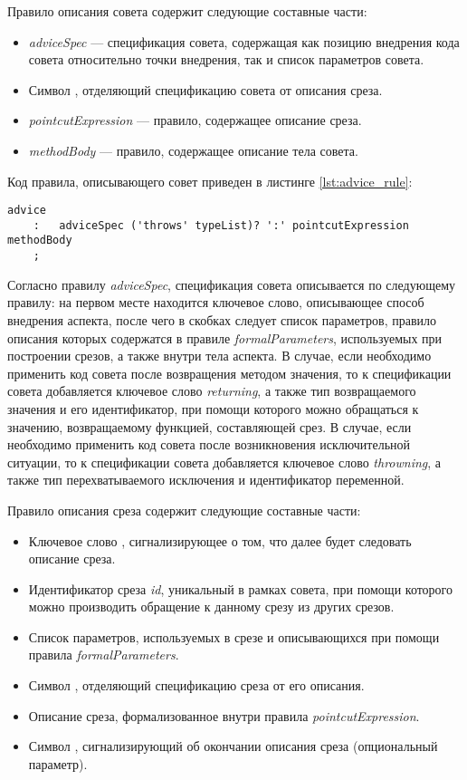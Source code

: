 Правило описания совета содержит следующие составные части:
\begin{itemize}
	\item \textit{adviceSpec} --- спецификация совета, содержащая как позицию
		  внедрения кода совета относительно точки внедрения, так и список
		  параметров совета.
	\item Символ \quotes{:}, отделяющий спецификацию совета от описания среза.
	\item \textit{pointcutExpression} --- правило, содержащее описание среза.
	\item \textit{methodBody} --- правило, содержащее описание тела совета.
\end{itemize}
Код правила, описывающего совет приведен в листинге \ref{lst:advice_rule}:
\begin{lstlisting}[style={java}, label={lst:advice_rule},
  caption={Правило описания совета advice}]
advice
	:	adviceSpec ('throws' typeList)? ':' pointcutExpression methodBody
	;
\end{lstlisting}

Согласно правилу \textit{adviceSpec}, спецификация совета описывается по
следующему правилу: на первом месте находится ключевое слово, описывающее
способ внедрения аспекта, после чего в скобках следует список параметров, правило описания которых содержатся в правиле \textit{formalParameters},
используемых при построении срезов, а также внутри тела аспекта.
В случае, если необходимо применить код совета после возвращения методом
значения, то к спецификации совета добавляется ключевое слово
\textit{returning}, а также тип возвращаемого значения и его идентификатор, при
помощи которого можно обращаться к значению, возвращаемому функцией,
составляющей срез.
В случае, если необходимо применить код совета после возникновения
исключительной ситуации, то к спецификации совета добавляется ключевое слово
\textit{throwning}, а также тип перехватываемого исключения и идентификатор переменной.

Правило описания среза содержит следующие составные части:
\begin{itemize}
	\item Ключевое слово , сигнализирующее о том, что далее
		  будет следовать описание среза.
	\item Идентификатор среза \textit{id}, уникальный в рамках совета, при
		  помощи которого можно производить обращение к данному срезу из других
		  срезов.
	\item Список параметров, используемых в срезе и описывающихся при помощи
		  правила \textit{formalParameters}.
	\item Символ \quotes{:}, отделяющий спецификацию среза от его описания.
	\item Описание среза, формализованное внутри правила
		  \textit{pointcutExpression}.
	\item Символ \quotes{;}, сигнализирующий об окончании описания среза
		  (опциональный параметр).
\end{itemize}

